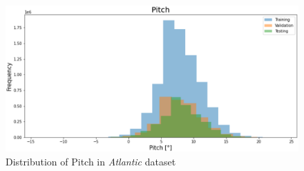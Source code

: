 \begin{figure}[h]
\centering
\includegraphics[width = \hsize]{figures/distributions/atlantic-Pitch.png}
\caption{Distribution of Pitch in \textit{Atlantic} dataset \cite{charles}}
\end{figure}

